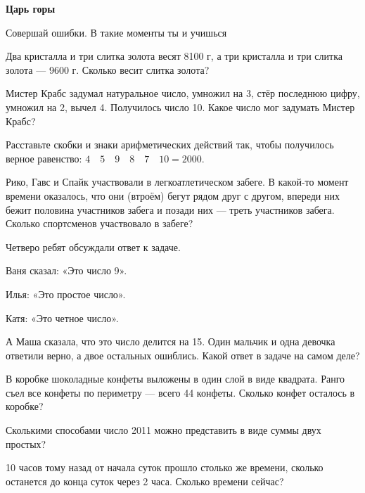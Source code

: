 \centerline{\bf \Huge Царь горы}


\begin{flushright}
        \scriptsize{Совершай ошибки. В такие моменты ты и учишься}
\end{flushright}


Два кристалла и три слитка золота весят 8100 г, а три кристалла и три слитка золота — 9600 г. Сколько весит слитка золота?

Мистер Крабс задумал натуральное число, умножил на 3, стёр последнюю цифру, умножил на 2, вычел 4. Получилось число 10. Какое число мог задумать Мистер Крабс?

Расставьте скобки и знаки арифметических действий так, чтобы получилось верное равенство: $4 \quad 5 \quad 9 \quad 8 \quad 7 \quad 10=2000$.

Рико, Гавс и Спайк участвовали в легкоатлетическом забеге. В какой-то момент времени оказалось, что они (втроём) бегут рядом друг с другом, впереди них бежит половина участников забега и позади них — треть участников забега. Сколько спортсменов участвовало в забеге?


Четверо ребят обсуждали ответ к задаче. 

Ваня сказал: «Это число 9».

Илья: «Это простое число».

Катя: «Это четное число».

А Маша сказала, что это число делится на 15.
Один мальчик и одна девочка ответили верно, а двое остальных ошиблись. Какой ответ в задаче на самом деле?

В коробке шоколадные конфеты выложены в один слой в виде квадрата. Ранго съел все конфеты по периметру — всего 44 конфеты. Сколько конфет осталось в коробке?


Сколькими способами число 2011 можно представить в виде суммы двух простых?

10 часов тому назад от начала суток прошло столько же времени, сколько останется до конца суток через 2 часа. Сколько времени сейчас?
